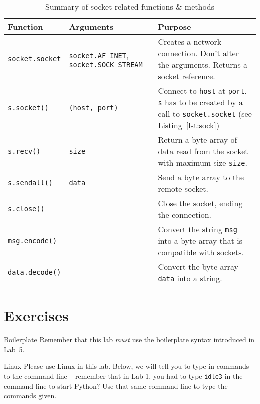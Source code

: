 \documentclass[11pt]{cselabheader}
\begin{document}
\begin{table}[!ht]
  \centering
  \begin{tabular}{p{2.5cm} p{3.3cm} p{10cm}}
    \toprule
    \bfseries Function & \bfseries Arguments & \bfseries Purpose \\
    \midrule
    \lstinline!socket.socket! & \lstinline!socket.AF_INET!, \lstinline!socket.SOCK_STREAM! &
    Creates a network connection. Don't alter the arguments. Returns a socket
    reference.\\
    \lstinline!s.socket()! & \lstinline!(host, port)! & Connect to
    \lstinline!host! at \lstinline!port!. \lstinline!s! has to be created by a
    call to \lstinline!socket.socket! (see Listing~\ref{lst:sock})\\
    \lstinline{s.recv()} & \lstinline{size} & Return a byte array of data read from the
    socket with maximum size \lstinline{size}.\\
    \lstinline{s.sendall()} & \lstinline{data} & Send a byte array to the remote socket.\\
    \lstinline{s.close()} & & Close the socket, ending the connection.\\
    \lstinline!msg.encode()! & & Convert the string \lstinline{msg} into a byte array
    that is compatible with sockets.\\
    \lstinline!data.decode()! & & Convert the byte array \lstinline{data} into a string.\\
    \bottomrule
  \end{tabular}
  \caption{Summary of socket-related functions \& methods}
  \label{tab:sum}
\end{table}

\pagebreak

\section{Exercises}
\label{sec:ex}

\begin{warningbox}{Boilerplate}
  Remember that this lab \emph{must} use the
  boilerplate syntax introduced in Lab~5.
\end{warningbox}

\begin{warningbox}{Linux}
  Please use Linux in this lab. Below, we will tell you to type in commands to
  the command line -- remember that in Lab 1, you had to type \texttt{idle3} in
  the command line to start Python? Use that same command line to type the
  commands given.
\end{warningbox}
\end{document}
